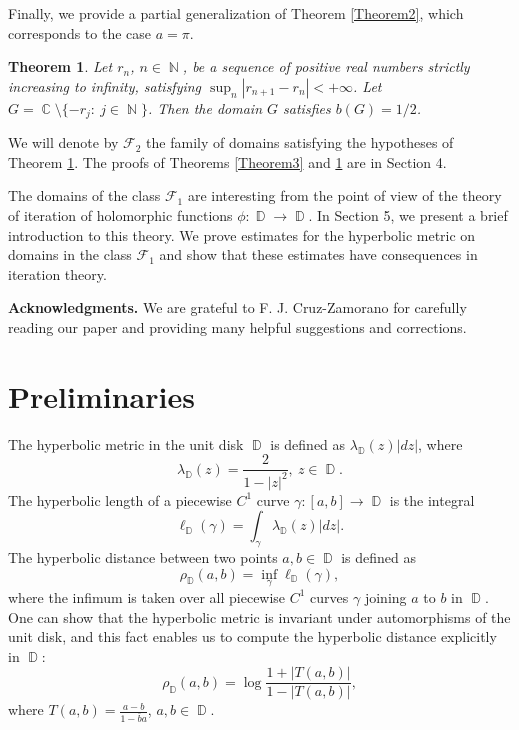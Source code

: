 \documentclass[11pt, letterpaper,leqno]{amsart}
\numberwithin{equation}{section}
\newtheorem{theorem}{Theorem}[section]
\theoremstyle{definition}
\DeclareMathOperator{\D}{\mathbb{D}}
\DeclareMathOperator{\N}{\mathbb{N}}
\DeclareMathOperator{\C}{\mathbb{C}}
\begin{document}
Finally, we provide a partial generalization of Theorem \ref{Theorem2}, which corresponds to the case $a=\pi$.

\begin{theorem}\label{Theorem4}
Let $r_n$, $n\in\N$, be a sequence of positive real numbers strictly increasing to infinity, satisfying $\sup_n |r_{n+1}-r_n|<+\infty$. Let $G=\C\setminus\{-r_j:\ j\in\N\}$. Then the domain $G$ satisfies $b(G)=1/2$.
\end{theorem}
We will denote by $\mathcal{F}_2$ the family of domains satisfying the hypotheses of Theorem \ref{Theorem4}. The proofs of Theorems \ref{Theorem3} and \ref{Theorem4} are in Section 4. 

\medskip

The domains of the class $\mathcal{F}_1$ are interesting from the point of view of the theory of iteration of holomorphic functions $\phi:\D\to\D$. 
In Section 5, we present a brief introduction to this theory. We prove estimates for the hyperbolic metric on domains in the class $\mathcal{F}_1$ and show that these estimates have consequences in iteration theory. 

\medskip

\textbf{Acknowledgments.} We are grateful to F. J. Cruz-Zamorano for carefully reading our paper and providing many helpful suggestions and corrections.


\section{Preliminaries}

The hyperbolic metric in the unit disk  $\D$ is defined as $\lambda_{\D} (z)|dz|$, where
\begin{equation}
\lambda_{\D} (z)=\frac{2}{1-|z|^2},\ z\in\D.
\end{equation}
The hyperbolic length of a piecewise $C^1$ curve $\gamma:[a,b]\to\D$ is the integral
\begin{equation}\label{length1}
\ell_{\D}(\gamma)=\int_{\gamma}\lambda_{\D}(z)|dz|.
\end{equation}
The hyperbolic distance between two points $a,b\in\D$ is defined as
\[
\rho_{\D}(a,b)=\inf_{\gamma}\ell_{\D}(\gamma),
\]
where the infimum is taken over all piecewise $C^1$ curves $\gamma$ joining $a$ to $b$ in $\D$. One can show that the hyperbolic metric is invariant under automorphisms of the unit disk, and this fact enables us to compute the hyperbolic distance explicitly in $\D$:
\begin{equation}\label{hypdisk}
\rho_{\D}(a,b)=\log\frac{1+|T(a,b)|}{1-|T(a,b)|},
\end{equation}
where $T(a,b)=\frac{a-b}{1-\bar{b}a}$, $a,b\in\D$.
\end{document}
